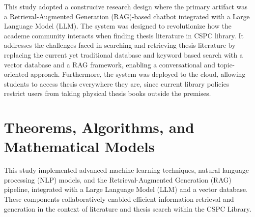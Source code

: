 \begin{refsection}
This study adopted a construcive research design where the primary artifact was a Retrieval-Augmented Generation (RAG)-based chatbot integrated with a Large Language Model (LLM). The system was designed to revolutionize how the academe community interacts when finding thesis literature in CSPC library. It addresses the challenges faced in searching and retrieving thesis literature by replacing the current yet traditional database and keyword based search with a vector database and a RAG framework, enabling a conversational and topic-oriented approach. Furthermore, the system was deployed to the cloud, allowing students to access thesis everywhere they are, since current library policies restrict users from taking physical thesis books outside the premises.





\section{Theorems, Algorithms, and Mathematical Models}

This study implemented advanced machine learning techniques, natural language processing (NLP) models, and the Retrieval-Augmented Generation (RAG) pipeline, integrated with a Large Language Model (LLM) and a vector database. These components collaboratively enabled efficient information retrieval and generation in the context of literature and thesis search within the CSPC Library.


\end{refsection}
